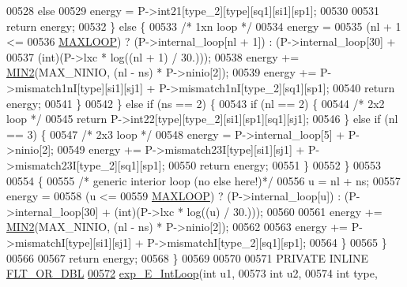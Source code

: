 \begin{DoxyCode}
00528         \textcolor{keywordflow}{else}
00529           energy = P->int21[type\_2][type][sq1][si1][sp1];
00530 
00531         \textcolor{keywordflow}{return} energy;
00532       \} \textcolor{keywordflow}{else} \{
00533         \textcolor{comment}{/* 1xn loop */}
00534         energy =
00535           (nl + 1 <=
00536            \hyperlink{constants_8h_ad1bd6eabac419670ddd3c9ed82145988}{MAXLOOP}) ? (P->internal\_loop[nl + 1]) : (P->internal\_loop[30] +
00537                                                     (int)(P->lxc * log((nl + 1) / 30.)));
00538         energy  += \hyperlink{group__utils_gae0b9cd0ce090bd69b951aa73e8fa4f7d}{MIN2}(MAX\_NINIO, (nl - ns) * P->ninio[2]);
00539         energy  += P->mismatch1nI[type][si1][sj1] + P->mismatch1nI[type\_2][sq1][sp1];
00540         \textcolor{keywordflow}{return} energy;
00541       \}
00542     \} \textcolor{keywordflow}{else} \textcolor{keywordflow}{if} (ns == 2) \{
00543       \textcolor{keywordflow}{if} (nl == 2) \{
00544         \textcolor{comment}{/* 2x2 loop */}
00545         \textcolor{keywordflow}{return} P->int22[type][type\_2][si1][sp1][sq1][sj1];
00546       \} \textcolor{keywordflow}{else} \textcolor{keywordflow}{if} (nl == 3) \{
00547         \textcolor{comment}{/* 2x3 loop */}
00548         energy  = P->internal\_loop[5] + P->ninio[2];
00549         energy  += P->mismatch23I[type][si1][sj1] + P->mismatch23I[type\_2][sq1][sp1];
00550         \textcolor{keywordflow}{return} energy;
00551       \}
00552     \}
00553 
00554     \{
00555       \textcolor{comment}{/* generic interior loop (no else here!)*/}
00556       u       = nl + ns;
00557       energy  =
00558         (u <=
00559          \hyperlink{constants_8h_ad1bd6eabac419670ddd3c9ed82145988}{MAXLOOP}) ? (P->internal\_loop[u]) : (P->internal\_loop[30] + (int)(P->lxc * log((u) / 30.)));
00560 
00561       energy += \hyperlink{group__utils_gae0b9cd0ce090bd69b951aa73e8fa4f7d}{MIN2}(MAX\_NINIO, (nl - ns) * P->ninio[2]);
00562 
00563       energy += P->mismatchI[type][si1][sj1] + P->mismatchI[type\_2][sq1][sp1];
00564     \}
00565   \}
00566 
00567   \textcolor{keywordflow}{return} energy;
00568 \}
00569 
00570 
00571 PRIVATE INLINE \hyperlink{group__data__structures_ga31125aeace516926bf7f251f759b6126}{FLT\_OR\_DBL}
\hyperlink{group__eval__deprecated_ga95de54d8a2a17645a95e0f34e189d9c9}{00572} \hyperlink{group__eval__deprecated_ga95de54d8a2a17645a95e0f34e189d9c9}{exp\_E\_IntLoop}(\textcolor{keywordtype}{int}               u1,
00573               \textcolor{keywordtype}{int}               u2,
00574               \textcolor{keywordtype}{int}               type,

\end{DoxyCode}
